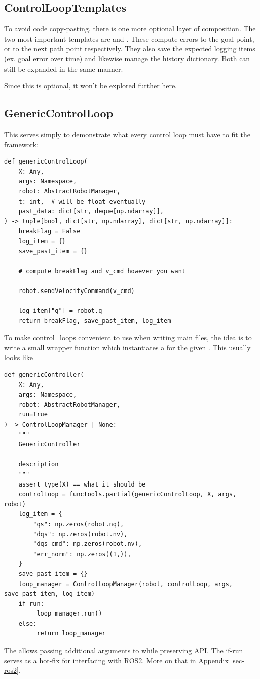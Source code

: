 \subsection{ControlLoopTemplates}
To avoid code copy-pasting, there is one more optional layer of composition.
The two most important templates are 
and . These compute 
errors to the goal point, or to the next path point respectively.
They also save the expected logging items (ex. goal error over time)
and likewise manage the history dictionary. Both can still be expanded
in the same manner.

Since this is optional, it won't be explored further here.

\subsection{GenericControlLoop} 
This serves simply to demonstrate what every control loop must have to 
fit the framework:
\begin{verbatim}
def genericControlLoop(
    X: Any,
    args: Namespace,
    robot: AbstractRobotManager,
    t: int,  # will be float eventually
    past_data: dict[str, deque[np.ndarray]],
) -> tuple[bool, dict[str, np.ndarray], dict[str, np.ndarray]]:
    breakFlag = False
    log_item = {}
    save_past_item = {}

    # compute breakFlag and v_cmd however you want

    robot.sendVelocityCommand(v_cmd)

    log_item["q"] = robot.q
    return breakFlag, save_past_item, log_item
\end{verbatim}

To make control\_loops convenient to use when writing main files,
the idea is to write a small wrapper function which instantiates
a  for the given
.
This usually looks like
\begin{verbatim}
def genericController(
    X: Any,
    args: Namespace,
    robot: AbstractRobotManager,
	run=True
) -> ControlLoopManager | None:
    """
    GenericController
	-----------------
	description
	"""
    assert type(X) == what_it_should_be
	controlLoop = functools.partial(genericControlLoop, X, args, robot)
    log_item = {
        "qs": np.zeros(robot.nq),
        "dqs": np.zeros(robot.nv),
        "dqs_cmd": np.zeros(robot.nv),
        "err_norm": np.zeros((1,)),
    }
	save_past_item = {}
    loop_manager = ControlLoopManager(robot, controlLoop, args, save_past_item, log_item)   
    if run:
         loop_manager.run()
    else:
         return loop_manager
\end{verbatim}
The  allows passing additional arguments
to  while preserving 
 API.
The if-run serves as a hot-fix for interfacing with ROS2. 
More on that in Appendix \ref{sec-ros2}.



